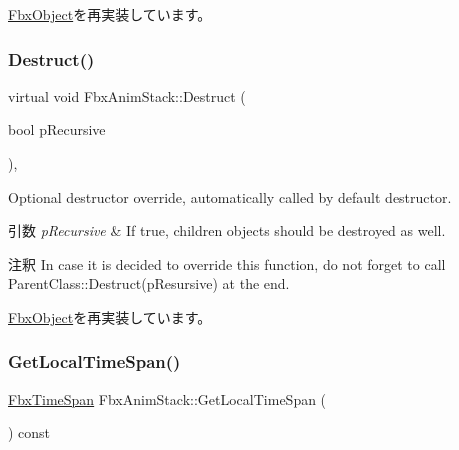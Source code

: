 \hyperlink{class_fbx_object_ad44f814323dc1b5e78bff1bfc608b4bb}{Fbx\+Object}を再実装しています。

\mbox{\label{class_fbx_anim_stack_a4809de086c3a2d28d98d771b011599d6}} 
\subsubsection{\texorpdfstring{Destruct()}{Destruct()}}
{\footnotesize\ttfamily virtual void Fbx\+Anim\+Stack\+::\+Destruct (\begin{DoxyParamCaption}\item[{bool}]{p\+Recursive }\end{DoxyParamCaption})\hspace{0.3cm}{\ttfamily [protected]}, {\ttfamily [virtual]}}

Optional destructor override, automatically called by default destructor. 
\begin{DoxyParams}{引数}
{\em p\+Recursive} & If true, children objects should be destroyed as well. \\
\hline
\end{DoxyParams}
\begin{DoxyRemark}{注釈}
In case it is decided to override this function, do not forget to call Parent\+Class\+::\+Destruct(p\+Resursive) at the end. 
\end{DoxyRemark}


\hyperlink{class_fbx_object_a123e084d9b32b29c28af6384b7c3c608}{Fbx\+Object}を再実装しています。

\mbox{\label{class_fbx_anim_stack_a61d246d787a9ac3ab230527e9bab00bb}} 
\subsubsection{\texorpdfstring{Get\+Local\+Time\+Span()}{GetLocalTimeSpan()}}
{\footnotesize\ttfamily \hyperlink{class_fbx_time_span}{Fbx\+Time\+Span} Fbx\+Anim\+Stack\+::\+Get\+Local\+Time\+Span (\begin{DoxyParamCaption}{ }\end{DoxyParamCaption}) const}

